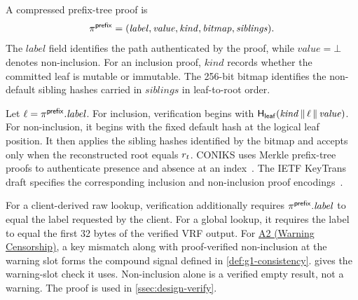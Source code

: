 \begin{definition}\label{def:noninclusion}
A compressed prefix-tree proof is
\[
\pi^{\mathsf{prefix}} =
(\mathit{label},\mathit{value},\mathit{kind},\mathit{bitmap},\mathit{siblings}).
\]
The $\mathit{label}$ field identifies the path authenticated by the proof, while
$\mathit{value}=\bot$ denotes non-inclusion. For an inclusion proof, $\mathit{kind}$ records whether
the committed leaf is mutable or immutable. The 256-bit bitmap identifies the non-default sibling
hashes carried in $\mathit{siblings}$ in leaf-to-root order.

Let $\ell=\pi^{\mathsf{prefix}}.\mathit{label}$. For inclusion, verification begins with
$\mathsf{H}_{\mathsf{leaf}}(\mathit{kind}\,\|\,\ell\,\|\,\mathit{value})$. For non-inclusion, it begins with the fixed
default hash at the logical leaf position. It then applies the sibling hashes identified by the
bitmap and accepts only when the reconstructed root equals $r_{t}$. CONIKS uses Merkle
prefix-tree proofs to authenticate presence and absence at an
index~\cite[Section~3.2]{melara2015coniks}. The IETF KeyTrans draft specifies the corresponding
inclusion and non-inclusion proof
encodings~\cite[Sections~3.3 and~12.2]{ietf-keytrans-protocol}.

For a client-derived raw lookup, verification additionally requires
$\pi^{\mathsf{prefix}}.\mathit{label}$ to equal the label requested by the client. For a global lookup, it
requires the label to equal the first 32 bytes of the verified VRF output. For
\hyperref[sc:threat-a2]{A2 (Warning Censorship)}, a key mismatch along with proof-verified
non-inclusion at the warning slot forms the compound signal defined in
\cref{def:g1-consistency}.  gives the warning-slot check it uses.
Non-inclusion alone is a verified empty result, not a warning. The proof
is used in \cref{ssec:design-verify}.
\end{definition}

